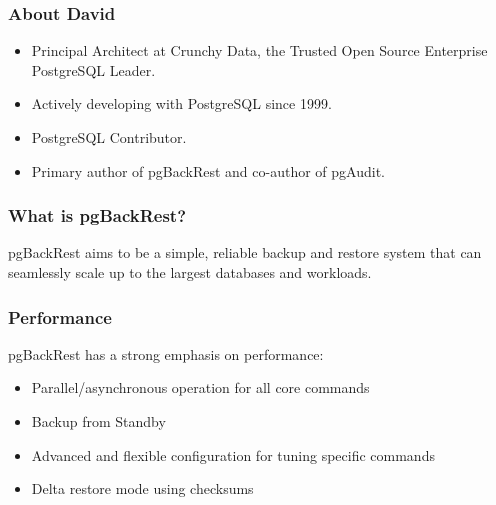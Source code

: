 %
\def\mytitle{pgBackRest Overview}
\def\mysubject{}
\def\myevent{Crunchy Storm}
\def\myauthor{David Steele}
\def\myemail{}
\def\mydate{November 28, 2018}

\def\mysuppressnav{}

\def\mytemplatepath{/template/}


\begin{frame}
    \frametitle{About David}

    \begin{itemize}
        \item Principal Architect at Crunchy Data, the Trusted Open Source Enterprise PostgreSQL Leader.
        \item Actively developing with PostgreSQL since 1999.
        \item PostgreSQL Contributor.
        \item Primary author of pgBackRest and co-author of pgAudit.
    \end{itemize}
\end{frame}

\begin{frame}
    \frametitle{What is pgBackRest?}

    pgBackRest aims to be a simple, reliable backup and restore system that can seamlessly scale up to the largest databases and workloads.\pause
\end{frame}

\begin{frame}
    \frametitle{Performance}

    pgBackRest has a strong emphasis on performance:

    \begin{itemize}
        \item Parallel/asynchronous operation for all core commands\pause
        \item Backup from Standby\pause
        \item Advanced and flexible configuration for tuning specific commands
        \item Delta restore mode using checksums\pause
    \end{itemize}
\end{frame}

